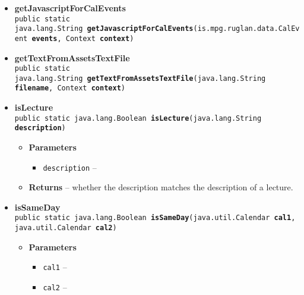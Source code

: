 \documentclass[11pt,a4paper]{report}
\begin{document}
{{{\begin{itemize}
{\begin{itemize}
{Initializes the googleMapsLink map.
}
\end{itemize}
}%
\item{ 
{\bf  getJavascriptForCalEvents}\\
\texttt{public static java.lang.String\ {\bf  getJavascriptForCalEvents}(\texttt{is.mpg.ruglan.data.CalEvent\lbrack \rbrack } {\bf  events},
\texttt{Context} {\bf  context})
\label{is.mpg.ruglan.utils.Utils.getJavascriptForCalEvents(is.mpg.ruglan.data.CalEvent[], Context)}}%
}%
\item{ 
{\bf  getTextFromAssetsTextFile}\\
\texttt{public static java.lang.String\ {\bf  getTextFromAssetsTextFile}(\texttt{java.lang.String} {\bf  filename},
\texttt{Context} {\bf  context})
\label{is.mpg.ruglan.utils.Utils.getTextFromAssetsTextFile(java.lang.String, Context)}}%
}%
\item{ 
{\bf  isLecture}\\
\texttt{public static java.lang.Boolean\ {\bf  isLecture}(\texttt{java.lang.String} {\bf  description})
\label{is.mpg.ruglan.utils.Utils.isLecture(java.lang.String)}}%
\begin{itemize}
\item{
{\bf  Parameters}
  \begin{itemize}
   \item{
\texttt{description} -- }
  \end{itemize}
}%
\item{{\bf  Returns} -- 
whether the description matches the description of a lecture. 
}%
\end{itemize}
}%
\item{ 
{\bf  isSameDay}\\
\texttt{public static java.lang.Boolean\ {\bf  isSameDay}(\texttt{java.util.Calendar} {\bf  cal1},
\texttt{java.util.Calendar} {\bf  cal2})
\label{is.mpg.ruglan.utils.Utils.isSameDay(java.util.Calendar, java.util.Calendar)}}%
\begin{itemize}
\item{
{\bf  Parameters}
  \begin{itemize}
   \item{
\texttt{cal1} -- }
   \item{
\texttt{cal2} -- }
  \end{itemize}
}
\end{itemize}}
\end{itemize}}}}
\end{document}
